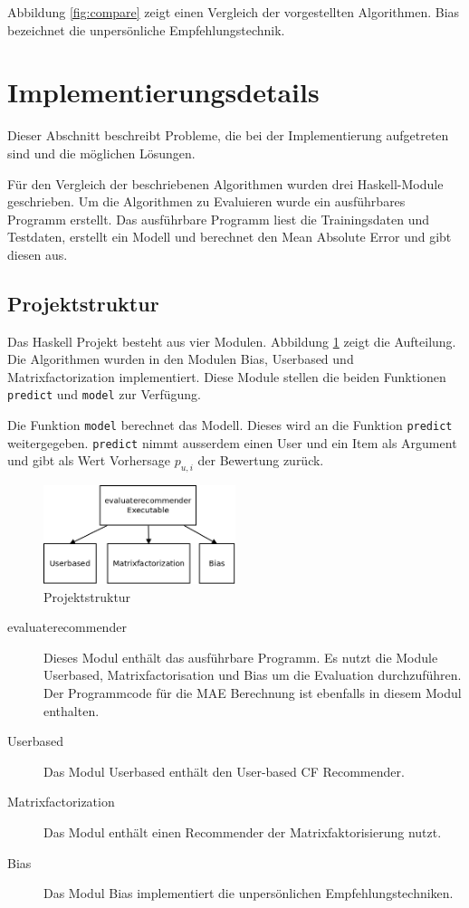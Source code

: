 \documentclass[a4paper, 12pt]{article}
\begin{document}
Abbildung \ref{fig:compare} zeigt einen Vergleich der vorgestellten Algorithmen. Bias bezeichnet die unpersönliche Empfehlungstechnik.

\section{Implementierungsdetails}
\label{sec:ram}

Dieser Abschnitt beschreibt Probleme, die bei der Implementierung aufgetreten sind und die möglichen Lösungen.

Für den Vergleich der beschriebenen Algorithmen wurden drei Haskell-Module geschrieben. Um die Algorithmen zu Evaluieren wurde ein ausführbares Programm erstellt. Das ausführbare Programm liest die Trainingsdaten und Testdaten, erstellt ein Modell und berechnet den Mean Absolute Error und gibt diesen aus.

\subsection{Projektstruktur}
\label{sec:structur}

Das Haskell Projekt besteht aus vier Modulen. Abbildung \ref{fig:structur} zeigt die Aufteilung. Die Algorithmen wurden in den Modulen Bias, Userbased und Matrixfactorization implementiert. Diese Module stellen die beiden Funktionen \verb|predict| und \verb|model| zur Verfügung.

Die Funktion \verb|model| berechnet das Modell. Dieses wird an die Funktion \verb|predict| weitergegeben. \verb|predict| nimmt ausserdem einen User und ein Item als Argument und gibt als Wert Vorhersage $p_{u,i}$ der Bewertung zurück.

\begin{figure}
  \centering
      \includegraphics[width=0.5\textwidth]{structur}
  \caption{Projektstruktur}
  \label{fig:structur}
\end{figure}

\begin{description}
\item[evaluaterecommender] Dieses Modul enthält das ausführbare Programm. Es nutzt die Module Userbased, Matrixfactorisation und Bias um die Evaluation durchzuführen. Der Programmcode für die MAE Berechnung ist ebenfalls in diesem Modul enthalten.
\item[Userbased] Das Modul Userbased enthält den User-based CF Recommender.
\item[Matrixfactorization] Das Modul enthält einen Recommender der Matrixfaktorisierung nutzt.
\item[Bias] Das Modul Bias implementiert die unpersönlichen Empfehlungstechniken.
\end{description}
\end{document}
